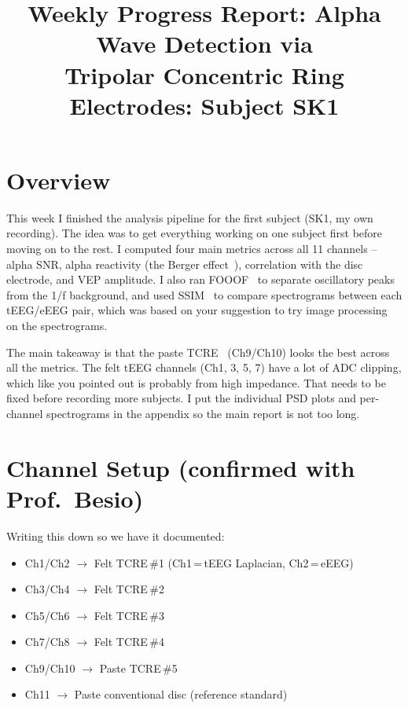 \documentclass[10pt,conference]{IEEEtran}
\begin{document}
\title{Weekly Progress Report: Alpha Wave Detection via\\
Tripolar Concentric Ring Electrodes: Subject SK1}

\author{%
  }

\maketitle

\section{Overview}

This week I finished the analysis pipeline for the first subject
(SK1, my own recording).
The idea was to get everything working on one subject first before
moving on to the rest.
I computed four main metrics across all 11 channels -- alpha SNR, alpha
reactivity (the Berger effect~\cite{kirschfeld2005}), correlation with the disc electrode, and VEP
amplitude.
I also ran FOOOF~\cite{donoghue2020} to separate oscillatory peaks from the 1/f background,
and used SSIM~\cite{wang2004} to compare spectrograms between each tEEG/eEEG pair,
which was based on your suggestion to try image processing on the spectrograms.

The main takeaway is that the paste TCRE~\cite{besio2006} (Ch9/Ch10) looks the best
across all the metrics.
The felt tEEG channels (Ch1, 3, 5, 7) have a lot of ADC clipping,
which like you pointed out is probably from high impedance.
That needs to be fixed before recording more subjects.
I put the individual PSD plots and per-channel spectrograms in the
appendix so the main report is not too long.

\section{Channel Setup (confirmed with Prof.\ Besio)}

Writing this down so we have it documented:

\begin{itemize}
  \item Ch1/Ch2 $\to$ Felt TCRE\,\#1 (Ch1\,=\,tEEG Laplacian, Ch2\,=\,eEEG)
  \item Ch3/Ch4 $\to$ Felt TCRE\,\#2
  \item Ch5/Ch6 $\to$ Felt TCRE\,\#3
  \item Ch7/Ch8 $\to$ Felt TCRE\,\#4
  \item Ch9/Ch10 $\to$ Paste TCRE\,\#5
  \item Ch11 $\to$ Paste conventional disc (reference standard)
\end{itemize}
\end{document}
